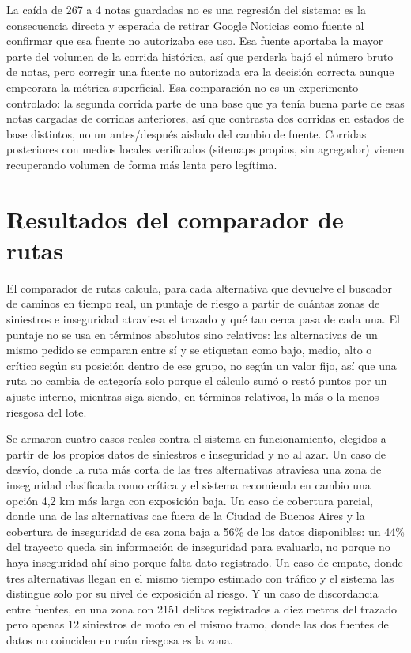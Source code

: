 La caída de 267 a 4 notas guardadas no es una regresión del sistema: es
la consecuencia directa y esperada de retirar Google Noticias como
fuente al confirmar que esa fuente no autorizaba ese uso. Esa fuente
aportaba la mayor parte del volumen de la corrida histórica, así que
perderla bajó el número bruto de notas, pero corregir una fuente no
autorizada era la decisión correcta aunque empeorara la métrica
superficial. Esa comparación no es un experimento controlado: la segunda
corrida parte de una base que ya tenía buena parte de esas notas
cargadas de corridas anteriores, así que contrasta dos corridas en
estados de base distintos, no un antes/después aislado del cambio de
fuente. Corridas posteriores con medios locales verificados (sitemaps
propios, sin agregador) vienen recuperando volumen de forma más lenta
pero legítima.

\section{Resultados del comparador de rutas}

El comparador de rutas calcula, para cada alternativa que devuelve el
buscador de caminos en tiempo real, un puntaje de riesgo a partir de
cuántas zonas de siniestros e inseguridad atraviesa el trazado y qué tan
cerca pasa de cada una. El puntaje no se usa en términos absolutos sino
relativos: las alternativas de un mismo pedido se comparan entre sí y se
etiquetan como bajo, medio, alto o crítico según su posición dentro de
ese grupo, no según un valor fijo, así que una ruta no cambia de
categoría solo porque el cálculo sumó o restó puntos por un ajuste
interno, mientras siga siendo, en términos relativos, la más o la menos
riesgosa del lote.

Se armaron cuatro casos reales contra el sistema en funcionamiento,
elegidos a partir de los propios datos de siniestros e inseguridad y no
al azar. Un caso de desvío, donde la ruta más corta de las tres
alternativas atraviesa una zona de inseguridad clasificada como crítica
y el sistema recomienda en cambio una opción 4,2 km más larga con
exposición baja. Un caso de cobertura parcial, donde una de las
alternativas cae fuera de la Ciudad de Buenos Aires y la cobertura de
inseguridad de esa zona baja a 56\% de los datos disponibles: un 44\%
del trayecto queda sin información de inseguridad para evaluarlo, no
porque no haya inseguridad ahí sino porque falta dato registrado. Un
caso de empate, donde tres alternativas llegan en el mismo tiempo
estimado con tráfico y el sistema las distingue solo por su nivel de
exposición al riesgo. Y un caso de discordancia entre fuentes, en una
zona con 2151 delitos registrados a diez metros del trazado pero apenas
12 siniestros de moto en el mismo tramo, donde las dos fuentes de datos
no coinciden en cuán riesgosa es la zona.

